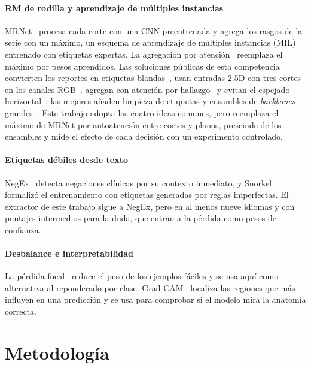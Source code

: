 \documentclass[conference]{IEEEtran}
\begin{document}
\paragraph*{RM de rodilla y aprendizaje de múltiples instancias}
MRNet~\cite{bien2018mrnet} procesa cada corte con una CNN preentrenada y agrega los rasgos de la serie con un máximo, un esquema de aprendizaje de múltiples instancias (MIL) entrenado con etiquetas expertas.
La agregación por atención~\cite{ilse2018attention} reemplaza el máximo por pesos aprendidos.
Las soluciones públicas de esta competencia convierten los reportes en etiquetas blandas~\cite{pilkwang2026baseline}, usan entradas 2.5D con tres cortes en los canales RGB~\cite{dread2026twelve,ab29knee}, agregan con atención por hallazgo~\cite{dread2026twelve} y evitan el espejado horizontal~\cite{bishnoi2026rsna}; las mejores añaden limpieza de etiquetas y ensambles de \emph{backbones} grandes~\cite{ab29knee}.
Este trabajo adopta las cuatro ideas comunes, pero reemplaza el máximo de MRNet por autoatención entre cortes y planos, prescinde de los ensambles y mide el efecto de cada decisión con un experimento controlado.

\paragraph*{Etiquetas débiles desde texto}
NegEx~\cite{chapman2001negex} detecta negaciones clínicas por su contexto inmediato, y Snorkel~\cite{ratner2017snorkel} formalizó el entrenamiento con etiquetas generadas por reglas imperfectas.
El extractor de este trabajo sigue a NegEx, pero en al menos nueve idiomas y con puntajes intermedios para la duda, que entran a la pérdida como pesos de confianza.

\paragraph*{Desbalance e interpretabilidad}
La pérdida focal~\cite{lin2017focal} reduce el peso de los ejemplos fáciles y se usa aquí como alternativa al reponderado por clase.
Grad-CAM~\cite{selvaraju2017gradcam} localiza las regiones que más influyen en una predicción y se usa para comprobar si el modelo mira la anatomía correcta.

\section{Metodología}
\label{sec:metodologia}
\end{document}

